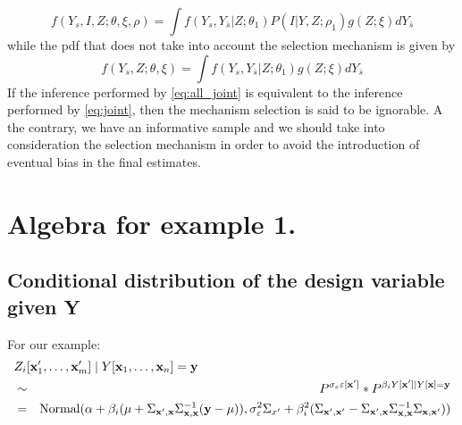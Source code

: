 \documentclass[12pt]{article}
\theoremstyle{definition}
\theoremstyle{remark}
\newcommand{\paramnuisance}{\xi}
\newcommand{\provar}{\Sigma}
\newcommand{\position}{\mathbf{x}}
\newcommand{\Signal}{Y}
\newcommand{\signal}{\mathbf{y}}
\newcommand{\indicator}{I}
\newcommand{\Desvar}{Z}
\begin{document}
\begin{equation} \label{eq:all_joint}
    f\left(\Signal_{s},\indicator,\Desvar;\theta,\paramnuisance,\rho\right)=\int{f\left(\Signal_{s},\Signal_{\bar{s}}|\Desvar;\theta_{1}\right)P\left(\indicator|\Signal,\Desvar;\rho_{1}\right)g\left(\Desvar;\paramnuisance\right)d\Signal_{\bar{s}}}
\end{equation}
while the pdf that does not take into account the selection mechanism is given by
\begin{equation} \label{eq:joint}
    f\left(\Signal_{s},\Desvar;\theta,\paramnuisance\right)=\int{f\left(\Signal_{s},\Signal_{\bar{s}}|\Desvar;\theta_{1}\right)g\left(\Desvar;\paramnuisance\right)d\Signal_{\bar{s}}}
\end{equation}
If the inference performed by \eqref{eq:all_joint} is equivalent to the inference performed by \eqref{eq:joint}, then the mechanism selection is said to be ignorable. A the contrary, we have an informative sample and we should take into consideration the selection mechanism in order to avoid the introduction of eventual bias in the final estimates.




\appendix
\section{Algebra for example 1.}

\subsection{Conditional distribution of the design variable given Y}
For our example:
\begin{eqnarray*}
\lefteqn{\Desvar_i[\position'_{1},\ldots,\position'_{m}]\mid\Signal[\position_{1},\dots,\position_{n}]=
    \signal}\\&\sim&
   P^{\sigma_\varepsilon\varepsilon[\position']}
   \ast 
    P^{\beta_i\Signal[\position']\mid\Signal[\position]=
    \signal}\\&=&
   \mathrm{Normal}(\alpha+\beta_i(\mu+\Sigma_{\position',\position}\Sigma_{\position,\position}^{-1} (\signal-\mu)),
\sigma_\varepsilon^2\provar_{x'}+\beta_i^2(\provar_{\position',\position'}-\provar_{\position',\position}\provar_{\position,\position}^{-1}\provar_{\position,\position'}))
    \end{eqnarray*}
\end{document}

